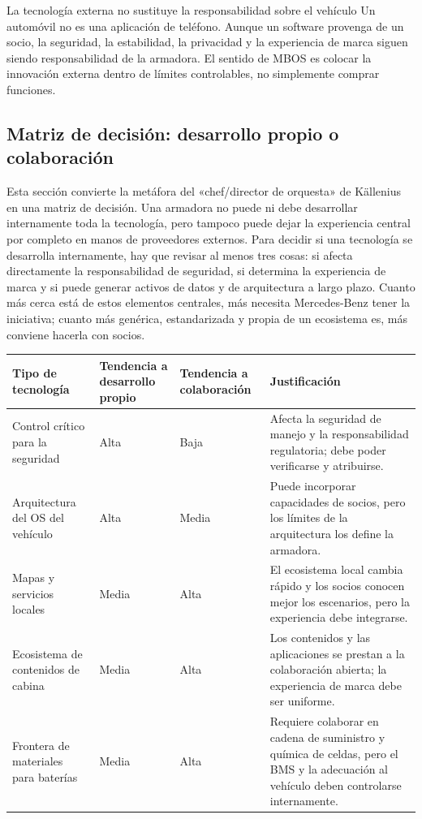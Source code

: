 \documentclass[a4paper]{article}
\begin{document}
\begin{warningbox}{La tecnología externa no sustituye la responsabilidad sobre el vehículo}
Un automóvil no es una aplicación de teléfono. Aunque un software provenga de un socio, la seguridad, la estabilidad, la privacidad y la experiencia de marca siguen siendo responsabilidad de la armadora. El sentido de MBOS es colocar la innovación externa dentro de límites controlables, no simplemente comprar funciones.
\end{warningbox}

\subsection{Matriz de decisión: desarrollo propio o colaboración}

Esta sección convierte la metáfora del «chef/director de orquesta» de Källenius en una matriz de decisión. Una armadora no puede ni debe desarrollar internamente toda la tecnología, pero tampoco puede dejar la experiencia central por completo en manos de proveedores externos. Para decidir si una tecnología se desarrolla internamente, hay que revisar al menos tres cosas: si afecta directamente la responsabilidad de seguridad, si determina la experiencia de marca y si puede generar activos de datos y de arquitectura a largo plazo. Cuanto más cerca está de estos elementos centrales, más necesita Mercedes-Benz tener la iniciativa; cuanto más genérica, estandarizada y propia de un ecosistema es, más conviene hacerla con socios.

\noindent\begin{tabularx}{\textwidth}{p{}p{}p{}X}
\toprule
Tipo de tecnología & Tendencia a desarrollo propio & Tendencia a colaboración & Justificación \\
\midrule
Control crítico para la seguridad & Alta & Baja & Afecta la seguridad de manejo y la responsabilidad regulatoria; debe poder verificarse y atribuirse. \\
Arquitectura del OS del vehículo & Alta & Media & Puede incorporar capacidades de socios, pero los límites de la arquitectura los define la armadora. \\
Mapas y servicios locales & Media & Alta & El ecosistema local cambia rápido y los socios conocen mejor los escenarios, pero la experiencia debe integrarse. \\
Ecosistema de contenidos de cabina & Media & Alta & Los contenidos y las aplicaciones se prestan a la colaboración abierta; la experiencia de marca debe ser uniforme. \\
Frontera de materiales para baterías & Media & Alta & Requiere colaborar en cadena de suministro y química de celdas, pero el BMS y la adecuación al vehículo deben controlarse internamente. \\
\bottomrule
\end{tabularx}
\end{document}

